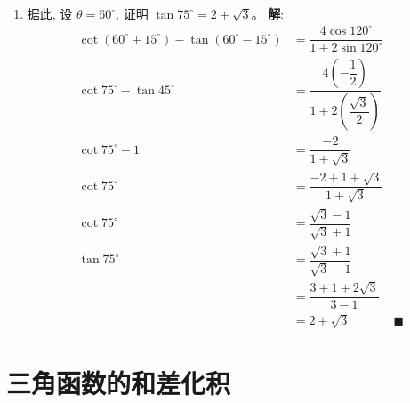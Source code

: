 \documentclass{report}
\newcommand{\sol}{\vspace{0.2cm}\textbf{解}:}
\begin{document}
\begin{enumerate}[leftmargin=*]
\begin{enumerate}
        \sol{}
        \begin{align*}
            \cot \left(\theta+15^{\circ}\right)-\tan \left(\theta-15^{\circ}\right) &= \dfrac{\cos(\theta+15^{\circ})}{\sin(\theta+15^{\circ})}-\dfrac{\sin(\theta-15^{\circ})}{\cos(\theta-15^{\circ})} \\
            & = \dfrac{\cos(\theta+15^{\circ})\cos(\theta-15^{\circ})-\sin(\theta+15^{\circ})\sin(\theta-15^{\circ})}{\sin(\theta+15^{\circ})\cos(\theta-15^{\circ})} \\
            & = \dfrac{\dfrac{1}{2}(\cos 2\theta + \cos 30^{\circ})+\dfrac{1}{2}(\cos 2\theta - \cos 30^{\circ})}{\dfrac{1}{2}(\sin 2\theta + \sin 30^{\circ})} \\
            & = \dfrac{\cos 2\theta +\cos 2\theta}{\sin 2\theta + \sin 30^{\circ}} \\
            & = \dfrac{2\cos 2\theta}{\dfrac{2\sin 2\theta + 1}{2}} \\
            & = \dfrac{4\cos 2\theta}{1+2\sin 2\theta} &\blacksquare
        \end{align*}

        \item 据此, 设 $\theta=60^{\circ}$, 证明 $\tan 75^{\circ}=2+\sqrt{3}$。
        \sol{}
        \begin{align*}
            \cot(60^{\circ}+15^{\circ})-\tan(60^{\circ}-15^{\circ}) &= \dfrac{4\cos 120^{\circ}}{1+2\sin 120^{\circ}} \\
            \cot 75^{\circ}-\tan 45^{\circ} &= \dfrac{4\left(-\dfrac{1}{2}\right)}{1+2\left(\dfrac{\sqrt{3}}{2}\right)} \\
            \cot 75^{\circ}-1 &= \dfrac{-2}{1+\sqrt{3}} \\
            \cot 75^{\circ} &= \dfrac{-2 + 1 + \sqrt{3}}{1+\sqrt{3}} \\
            \cot 75^{\circ} &= \dfrac{\sqrt{3}-1}{\sqrt{3}+1} \\
            \tan 75^{\circ} &= \dfrac{\sqrt{3}+1}{\sqrt{3}-1} \\
            & = \dfrac{3 + 1 + 2\sqrt{3}}{3-1} \\
            & = 2+\sqrt{3} &\blacksquare
        \end{align*}
    \end{enumerate}
\end{enumerate}

\newpage
\section{三角函数的和差化积}
\end{document}
